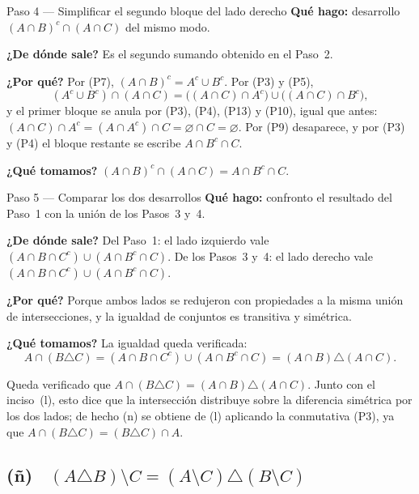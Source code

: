 \documentclass[11pt]{article}
\begin{document}
\begin{paso}{Paso 4 --- Simplificar el segundo bloque del lado derecho}
\textbf{Qué hago:} desarrollo $(A\cap B)^{c}\cap(A\cap C)$ del mismo modo.

\textbf{¿De dónde sale?} Es el segundo sumando obtenido en el Paso~2.

\textbf{¿Por qué?} Por (P7), $(A\cap B)^{c}=A^{c}\cup B^{c}$. Por (P3) y (P5),
\[
(A^{c}\cup B^{c})\cap(A\cap C)=\bigl((A\cap C)\cap A^{c}\bigr)\cup\bigl((A\cap C)\cap B^{c}\bigr),
\]
y el primer bloque se anula por (P3), (P4), (P13) y (P10), igual que antes:
$(A\cap C)\cap A^{c}=(A\cap A^{c})\cap C=\varnothing\cap C=\varnothing$. Por (P9) desaparece, y
por (P3) y (P4) el bloque restante se escribe $A\cap B^{c}\cap C$.

\textbf{¿Qué tomamos?} $(A\cap B)^{c}\cap(A\cap C)=A\cap B^{c}\cap C$.
\end{paso}

\begin{paso}{Paso 5 --- Comparar los dos desarrollos}
\textbf{Qué hago:} confronto el resultado del Paso~1 con la unión de los Pasos~3 y~4.

\textbf{¿De dónde sale?} Del Paso~1: el lado izquierdo vale
$(A\cap B\cap C^{c})\cup(A\cap B^{c}\cap C)$. De los Pasos~3 y~4: el lado derecho vale
$(A\cap B\cap C^{c})\cup(A\cap B^{c}\cap C)$.

\textbf{¿Por qué?} Porque ambos lados se redujeron con propiedades a la misma unión de
intersecciones, y la igualdad de conjuntos es transitiva y simétrica.

\textbf{¿Qué tomamos?} La igualdad queda verificada:
\[
A\cap(B\triangle C)=(A\cap B\cap C^{c})\cup(A\cap B^{c}\cap C)=(A\cap B)\triangle(A\cap C).
\]
\end{paso}

\begin{resp}
Queda verificado que $A\cap(B\triangle C)=(A\cap B)\triangle(A\cap C)$. Junto con el inciso~(l),
esto dice que la intersección distribuye sobre la diferencia simétrica por los dos lados; de
hecho (n) se obtiene de (l) aplicando la conmutativa (P3), ya que
$A\cap(B\triangle C)=(B\triangle C)\cap A$.
\end{resp}

\subsection*{(ñ) \ $(A\triangle B)\setminus C=(A\setminus C)\triangle(B\setminus C)$}
\end{document}
